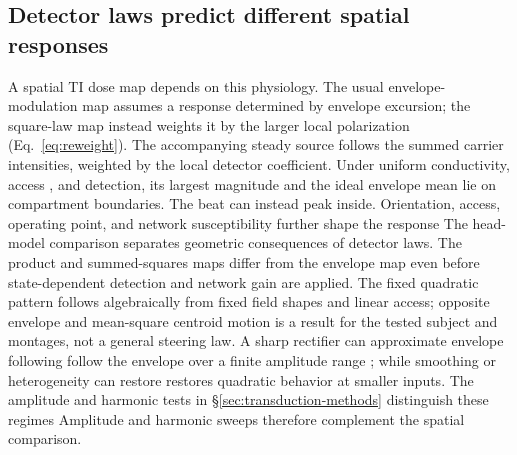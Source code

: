 \documentclass[11pt,a4paper]{article}
\providecommand{\DIFaddtex}[1]{{\protect\color{blue} \sf #1}} %
\providecommand{\DIFdeltex}[1]{{\protect\color{red} \scriptsize #1}} %
\providecommand{\DIFaddbegin}{} %
\providecommand{\DIFaddend}{} %
\providecommand{\DIFdelbegin}{} %
\providecommand{\DIFdelend}{} %
\providecommand{\DIFadd}[1]{\texorpdfstring{\DIFaddtex{#1}}{#1}} %
\providecommand{\DIFdel}[1]{\texorpdfstring{\DIFdeltex{#1}}{}} %
\begin{document}
\subsection{Detector laws predict different spatial responses}
\DIFdelbegin \DIFdel{A spatial TI dose map depends on this physiology. The usual envelope-modulation
map assumes a response determined by envelope excursion; the
square-law map
instead weights it by the larger local polarization (Eq.~\eqref{eq:reweight}).
The accompanying steady source follows the summed carrier intensities,
weighted by the local detector coefficient. Under uniform conductivity,
access , and detection, its largest magnitude and the ideal envelope mean
lie on compartment boundaries. The beat can instead peak inside.
Orientation, access, operating point, and network susceptibility further shape
the response}\DIFdelend \DIFaddbegin \DIFadd{The head-model comparison separates geometric consequences of detector laws.
The product and summed-squares maps differ from the envelope map even before
state-dependent detection and network gain are applied. The fixed quadratic
pattern follows algebraically from fixed field shapes and linear access;
opposite envelope and mean-square centroid motion is a result for the tested
subject and montages, not a general steering law}\DIFaddend . A sharp rectifier can \DIFdelbegin \DIFdel{approximate
envelope following }\DIFdelend \DIFaddbegin \DIFadd{follow
the envelope }\DIFaddend over a finite amplitude range \DIFdelbegin \DIFdel{; }\DIFdelend \DIFaddbegin \DIFadd{while }\DIFaddend smoothing or heterogeneity
\DIFdelbegin \DIFdel{can restore }\DIFdelend \DIFaddbegin \DIFadd{restores }\DIFaddend quadratic behavior at smaller inputs. \DIFdelbegin \DIFdel{The amplitude and harmonic tests in \S\ref{sec:transduction-methods} distinguish these regimes}\DIFdelend \DIFaddbegin \DIFadd{Amplitude and harmonic sweeps
therefore complement the spatial comparison}\DIFaddend .
\end{document}
